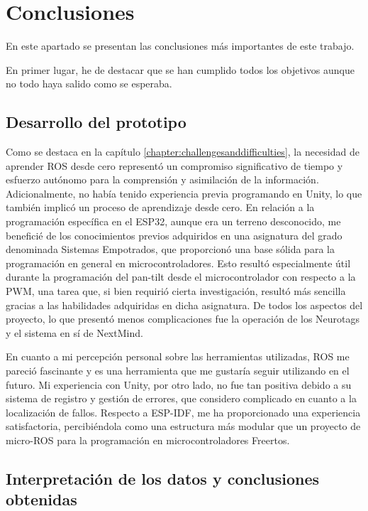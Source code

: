 \section{Conclusiones}

En este apartado se presentan las conclusiones m\'as importantes de este trabajo. 

En primer lugar, he de destacar que se han cumplido todos los objetivos aunque no todo haya salido como se esperaba.

\subsection{Desarrollo del prototipo}
Como se destaca en la capítulo \ref{chapter:challengesanddifficulties}, la necesidad de aprender ROS desde cero representó un compromiso significativo de tiempo y esfuerzo autónomo para la comprensión y asimilación de la información. Adicionalmente, no había tenido experiencia previa programando en Unity, lo que también implicó un proceso de aprendizaje desde cero. En relación a la programación específica en el ESP32, aunque era un terreno desconocido, me beneficié de los conocimientos previos adquiridos en una asignatura del grado denominada Sistemas Empotrados, que proporcionó una base sólida para la programación en general en microcontroladores. Esto resultó especialmente útil durante la programación del pan-tilt desde el microcontrolador con respecto a la PWM, una tarea que, si bien requirió cierta investigación, resultó más sencilla gracias a las habilidades adquiridas en dicha asignatura. De todos los aspectos del proyecto, lo que presentó menos complicaciones fue la operación de los Neurotags y el sistema en sí de NextMind.

En cuanto a mi percepción personal sobre las herramientas utilizadas, ROS me pareció fascinante y es una herramienta que me gustaría seguir utilizando en el futuro. Mi experiencia con Unity, por otro lado, no fue tan positiva debido a su sistema de registro y gestión de errores, que considero complicado en cuanto a la localizaci\'on de fallos. Respecto a ESP-IDF, me ha proporcionado una experiencia satisfactoria, percibiéndola como una estructura más modular que un proyecto de micro-ROS para la programación en microcontroladores Freertos.

\subsection{Interpretación de los datos y conclusiones obtenidas}
 
